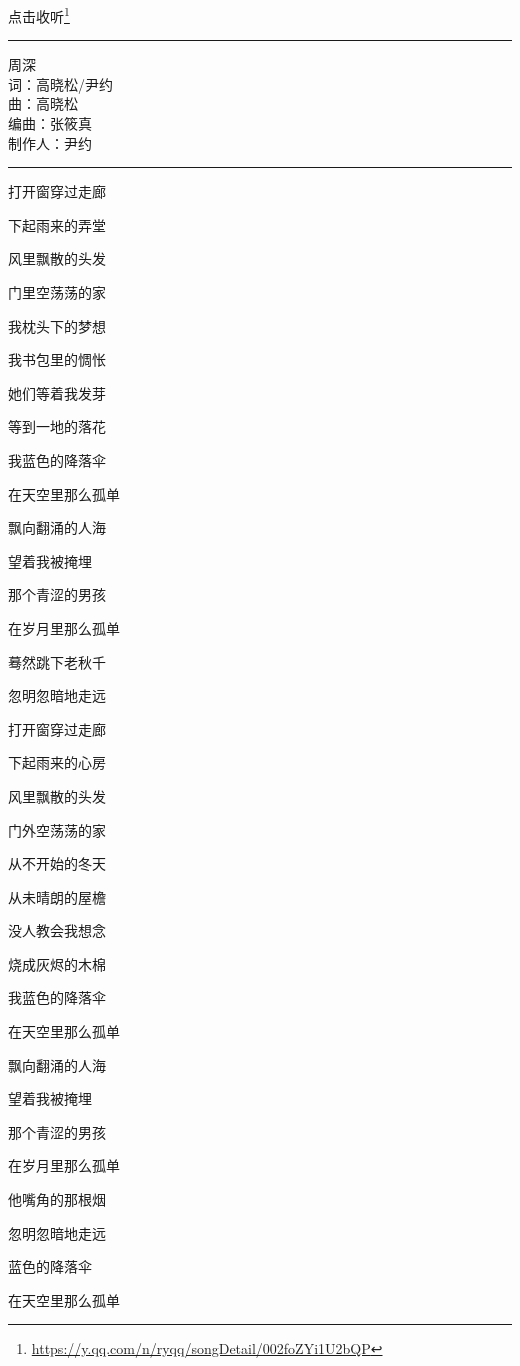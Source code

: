 \documentclass[]{ctexbook}
\renewcommand{\href}[2]{#2\footnote{\url{#1}}}
\begin{document}
\href{https://y.qq.com/n/ryqq/songDetail/002foZYi1U2bQP}{点击收听}

\begin{center}\rule{0.5\linewidth}{0.5pt}\end{center}

周深\\
词：高晓松/尹约\\
曲：高晓松\\
编曲：张筱真\\
制作人：尹约

\begin{center}\rule{0.5\linewidth}{0.5pt}\end{center}

打开窗穿过走廊

下起雨来的弄堂

风里飘散的头发

门里空荡荡的家

我枕头下的梦想

我书包里的惆怅

她们等着我发芽

等到一地的落花

我蓝色的降落伞

在天空里那么孤单

飘向翻涌的人海

望着我被掩埋

那个青涩的男孩

在岁月里那么孤单

蓦然跳下老秋千

忽明忽暗地走远

打开窗穿过走廊

下起雨来的心房

风里飘散的头发

门外空荡荡的家

从不开始的冬天

从未晴朗的屋檐

没人教会我想念

烧成灰烬的木棉

我蓝色的降落伞

在天空里那么孤单

飘向翻涌的人海

望着我被掩埋

那个青涩的男孩

在岁月里那么孤单

他嘴角的那根烟

忽明忽暗地走远

蓝色的降落伞

在天空里那么孤单
\end{document}

